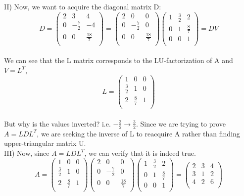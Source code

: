 \documentclass{article}
\begin{document}
II) Now, we want to acquire the diagonal matrix D:\\
\[
D =
\left(
\begin{array}{rrr}
2 & 3 & 4 \\
0 & -\frac{7}{2} & -4 \\
0 & 0 & \frac{18}{7} \\
\end{array}
\right) = 
\left(
\begin{array}{rrr}
2 & 0 & 0 \\
0 & -\frac{7}{2} & 0 \\
0 & 0 & \frac{18}{7} \\
\end{array}
\right)
\left(
\begin{array}{rrr}
1 & \frac{3}{2} & 2 \\
0 & 1 & \frac{8}{7} \\
0 & 0 & 1 \\
\end{array}
\right) = DV
\]\\
We can see that the L matrix corresponds to the LU-factorization of A and $V = L^T$,\\
\[
L =
\left(
\begin{array}{rrr}
1 & 0 & 0 \\
\frac{3}{2} & 1 & 0 \\
2 & \frac{8}{7} & 1 \\
\end{array}
\right)
\]\\
But why is the values inverted? i.e. $-\frac{3}{2} \rightarrow \frac{3}{2}$. Since we are trying to prove $A = LDL^T$, we are seeking the inverse of L to reacquire A rather than finding upper-triangular matrix U.\\

III) Now, since $A = LDL^T$, we can verify that it is indeed true.
\[
A = 
\left(
\begin{array}{rrr}
1 & 0 & 0 \\
\frac{3}{2} & 1 & 0 \\
2 & \frac{8}{7} & 1 \\
\end{array}
\right)
\left(
\begin{array}{rrr}
2 & 0 & 0 \\
0 & -\frac{7}{2} & 0 \\
0 & 0 & \frac{18}{7} \\
\end{array}
\right)
\left(
\begin{array}{rrr}
1 & \frac{3}{2} & 2 \\
0 & 1 & \frac{8}{7} \\
0 & 0 & 1 \\
\end{array}
\right) = 
\left(
\begin{array}{rrr}
2 & 3 & 4 \\
3 & 1 & 2 \\
4 & 2 & 6 \\
\end{array}
\right)
\]\\
\end{document}
